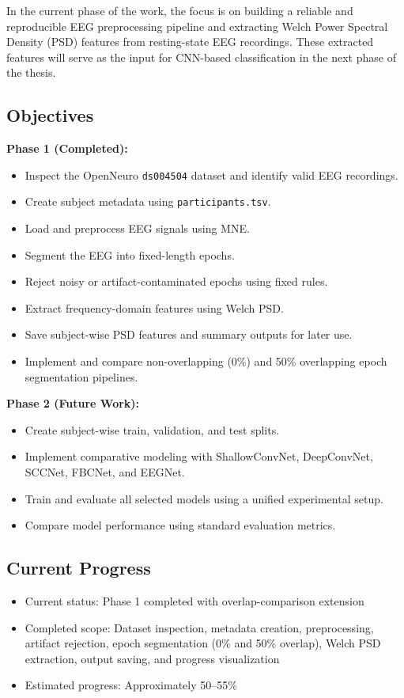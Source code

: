 \documentclass[12pt,a4paper]{article}
\begin{document}
In the current phase of the work, the focus is on building a reliable and reproducible EEG preprocessing pipeline and extracting Welch Power Spectral Density (PSD) features from resting-state EEG recordings. These extracted features will serve as the input for CNN-based classification in the next phase of the thesis.

\subsection{Objectives}
\textbf{Phase 1 (Completed):}
\begin{itemize}[leftmargin=2em]
    \item Inspect the OpenNeuro \texttt{ds004504} dataset and identify valid EEG recordings.
    \item Create subject metadata using \texttt{participants.tsv}.
    \item Load and preprocess EEG signals using MNE.
    \item Segment the EEG into fixed-length epochs.
    \item Reject noisy or artifact-contaminated epochs using fixed rules.
    \item Extract frequency-domain features using Welch PSD.
    \item Save subject-wise PSD features and summary outputs for later use.
    \item Implement and compare non-overlapping (0\%) and 50\% overlapping epoch segmentation pipelines.
\end{itemize}

\textbf{Phase 2 (Future Work):}
\begin{itemize}[leftmargin=2em]
    \item Create subject-wise train, validation, and test splits.
    \item Implement comparative modeling with ShallowConvNet, DeepConvNet, SCCNet, FBCNet, and EEGNet.
    \item Train and evaluate all selected models using a unified experimental setup.
    \item Compare model performance using standard evaluation metrics.
\end{itemize}

\subsection{Current Progress}
\begin{itemize}
    \item Current status: Phase 1 completed with overlap-comparison extension
    \item Completed scope: Dataset inspection, metadata creation, preprocessing, artifact rejection, epoch segmentation (0\% and 50\% overlap), Welch PSD extraction, output saving, and progress visualization
    \item Estimated progress: Approximately 50--55\%
\end{itemize}
\end{document}
